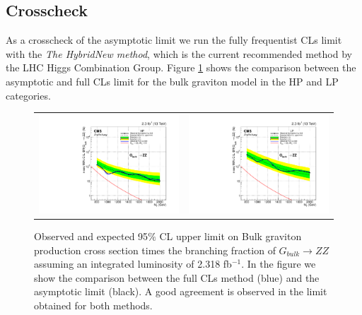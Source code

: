 \subsection{Crosscheck}

As a crosscheck of the asymptotic limit we run the fully frequentist CLs limit with the \emph{The HybridNew method}, which is the current recommended method by the LHC Higgs Combination Group.  
Figure \ref{fig:fulllimits} shows the comparison between the asymptotic and full CLs limit for the bulk graviton model in the HP and LP categories. 

\begin{figure}[!ht]
\caption{Observed and expected 95$\%$ CL upper limit on Bulk graviton production cross section times the branching fraction of $G_{bulk} \rightarrow  ZZ$ assuming an integrated luminosity of 2.318 fb$^{-1}$. In the figure we show the comparison between the full CLs method (blue) and the asymptotic limit (black). A good agreement is observed in the limit obtained for both methods.}
\begin{tabular}{cc}
  \includegraphics[width=200pt]{figuresARC/limits/fulllimitBulkGHP.pdf} &
  \includegraphics[width=200pt]{figuresARC/limits/limitBulkGFullLP.pdf}\\
\end{tabular}
\label{fig:fulllimits}
\end{figure}



